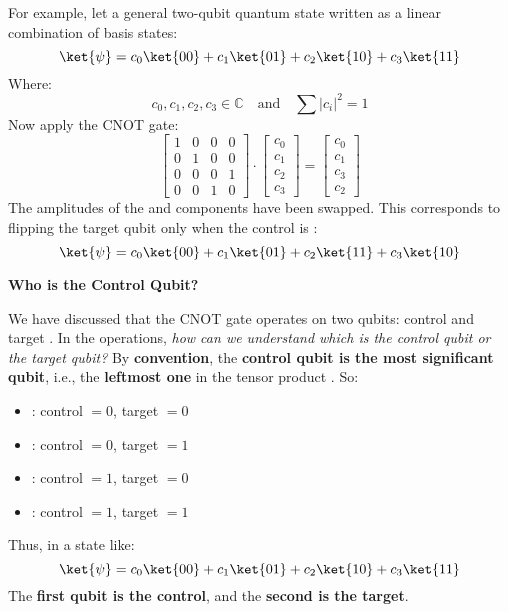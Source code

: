 \highspace
For example, let a general two-qubit quantum state written as a linear combination of basis states:
\begin{equation*}
    \ket{\psi} = c_{0}\ket{00} + c_{1}\ket{01} + c_{2}\ket{10} + c_{3}\ket{11}
\end{equation*}
Where:
\begin{equation*}
    c_{0}, c_{1}, c_{2}, c_{3} \in \mathbb{C} \hspace{1em} \text{and} \hspace{1em} \sum\left|c_{i}\right|^{2} = 1
\end{equation*}
Now apply the CNOT gate:
\begin{equation*}
    \begin{bmatrix}
        1 & 0 & 0 & 0 \\
        0 & 1 & 0 & 0 \\
        0 & 0 & 0 & 1 \\
        0 & 0 & 1 & 0
    \end{bmatrix} \cdot
    \begin{bmatrix}
        c_{0} \\ c_{1} \\ c_{2} \\ c_{3}
    \end{bmatrix} =
    \begin{bmatrix}
        c_{0} \\ c_{1} \\ c_{3} \\ c_{2}
    \end{bmatrix}
\end{equation*}
The amplitudes of the  and  components have been swapped. This corresponds to flipping the target qubit only when the control is :
\begin{equation*}
    \ket{\psi} = c_{0}\ket{00} + c_{1}\ket{01} + c_{2}\ket{11} + c_{3}\ket{10}
\end{equation*}

\highspace
\begin{flushleft}
    \textcolor{Green3}{ \textbf{Who is the Control Qubit?}}
\end{flushleft}
We have discussed that the CNOT gate operates on two qubits: control  and target . In the operations, \emph{how can we understand which is the control qubit or the target qubit?} By \textbf{convention}, the \textbf{control qubit is the most significant qubit}, i.e., the \textbf{leftmost one} in the tensor product . So:
\begin{itemize}
    \item {}: control $= 0$, target $= 0$
    \item {}: control $= 0$, target $= 1$
    \item {}: control $= 1$, target $= 0$
    \item {}: control $= 1$, target $= 1$
\end{itemize}
Thus, in a state like:
\begin{equation*}
    \ket{\psi} = c_{0}\ket{00} + c_{1}\ket{01} + c_{2}\ket{10} + c_{3}\ket{11}
\end{equation*}
The \textbf{first qubit is the control}, and the \textbf{second is the target}.

